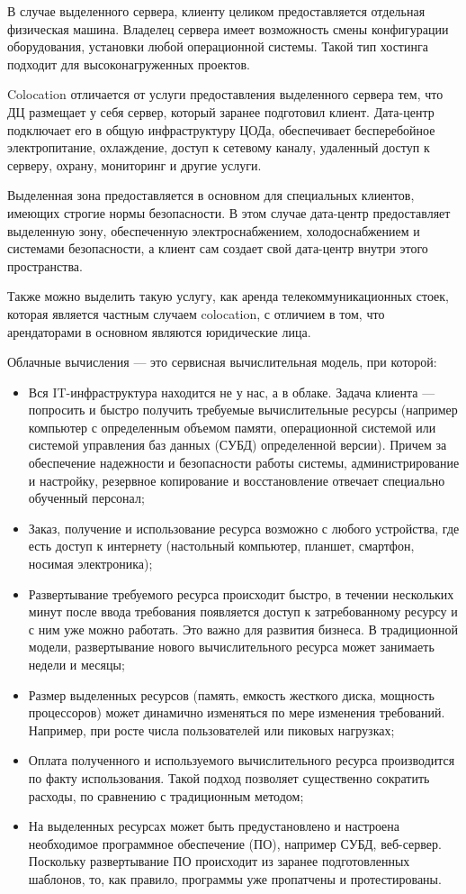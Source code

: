 В случае выделенного сервера, клиенту целиком предоставляется отдельная физическая машина.
Владелец сервера имеет возможность смены конфигурации оборудования, установки любой операционной системы.
Такой тип хостинга подходит для высоконагруженных проектов.

Colocation отличается от услуги предоставления выделенного сервера тем, что ДЦ размещает у себя сервер, который заранее подготовил клиент.
Дата-центр подключает его в общую инфраструктуру ЦОДа, обеспечивает бесперебойное электропитание, охлаждение, доступ к сетевому каналу, удаленный доступ к серверу, охрану, мониторинг и другие услуги.

Выделенная зона предоставляется в основном для специальных клиентов, имеющих строгие нормы безопасности.
В этом случае дата-центр предоставляет выделенную зону, обеспеченную электроснабжением, холодоснабжением и системами безопасности, а клиент сам создает свой дата-центр внутри этого пространства.

Также можно выделить такую услугу, как аренда телекоммуникационных стоек, которая является частным случаем colocation, с отличием в том, что арендаторами в основном являются юридические лица.

Облачные вычисления --- это сервисная вычислительная модель, при которой:
\begin{itemize}
  \item Вся IT-инфраструктура находится не у нас, а в облаке.
  Задача клиента --- попросить и быстро получить требуемые вычислительные ресурсы (например компьютер с определенным объемом памяти, операционной системой или системой управления баз данных (СУБД) определенной версии).
  Причем за обеспечение надежности и безопасности работы системы, администрирование и настройку, резервное копирование и восстановление отвечает специально обученный персонал;
  \item Заказ, получение и использование ресурса возможно с любого устройства, где есть доступ к интернету (настольный компьютер, планшет, смартфон, носимая электроника);
  \item Развертывание требуемого ресурса происходит быстро, в течении нескольких минут после ввода требования появляется доступ к затребованному ресурсу и с ним уже можно работать.
  Это важно для развития бизнеса.
  В традиционной модели, развертывание нового вычислительного ресурса может занимаеть недели и месяцы;
  \item Размер выделенных ресурсов (память, емкость жесткого диска, мощность процессоров) может динамично изменяться по мере изменения требований.
  Например, при росте числа пользователей или пиковых нагрузках;
  \item Оплата полученного и используемого вычислительного ресурса производится по факту использования.
  Такой подход позволяет существенно сократить расходы, по сравнению с традиционным методом;
  \item На выделенных ресурсах может быть предустановлено и настроена необходимое программное обеспечение (ПО), например СУБД, веб-сервер.
  Поскольку развертывание ПО происходит из заранее подготовленных шаблонов, то, как правило, программы уже пропатчены и протестированы.
\end{itemize}

